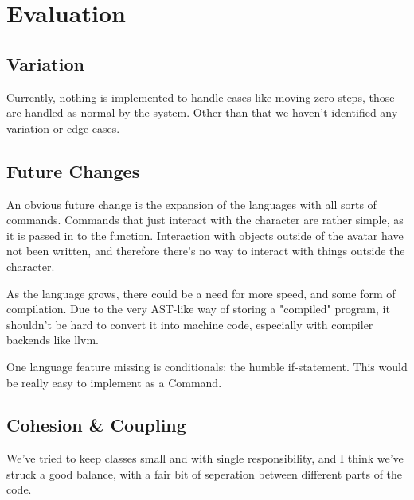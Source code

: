 \chapter{Evaluation}

\section{Variation}
Currently, nothing is implemented to handle cases like moving zero steps, those are handled as normal by the system. Other than that we haven't identified any variation or edge cases.

\section{Future Changes}
An obvious future change is the expansion of the languages with all sorts of commands. Commands that just interact with the character are rather simple, as it is passed in to the function. Interaction
with objects outside of the avatar have not been written, and therefore there's no way to interact with things outside the character. 

As the language grows, there could be a need for more speed, and some form of compilation. Due to the very AST-like way of storing a "compiled" program, it shouldn't be hard to convert it into machine
code, especially with compiler backends like llvm.

One language feature missing is conditionals: the humble if-statement. This would be really easy to implement as a Command.

\section{Cohesion \& Coupling}
We've tried to keep classes small and with single responsibility, and I think we've struck a good balance, with a fair bit of seperation between different parts of the code.
